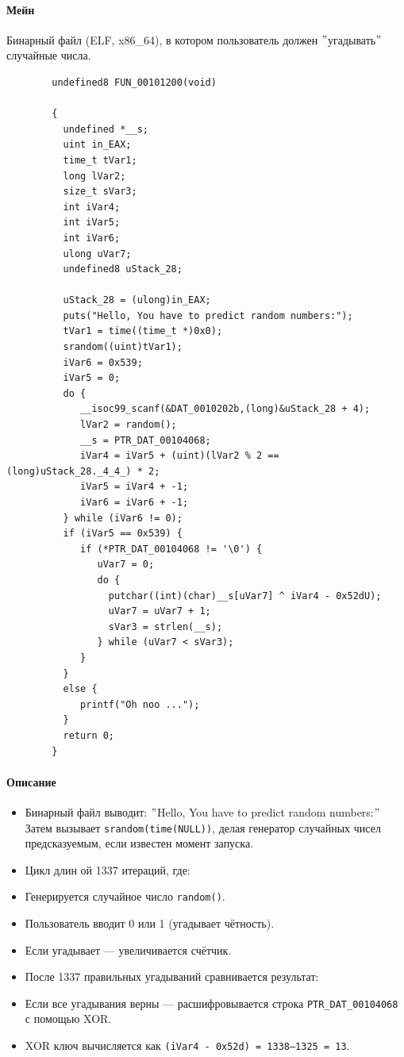 \paragraph{Мейн}
Бинарный файл (ELF, x86\_64), в котором пользователь должен \("\)угадывать\("\) случайные числа.
\begin{verbatim}
        undefined8 FUN_00101200(void)

        {
          undefined *__s;
          uint in_EAX;
          time_t tVar1;
          long lVar2;
          size_t sVar3;
          int iVar4;
          int iVar5;
          int iVar6;
          ulong uVar7;
          undefined8 uStack_28;

          uStack_28 = (ulong)in_EAX;
          puts("Hello, You have to predict random numbers:");
          tVar1 = time((time_t *)0x0);
          srandom((uint)tVar1);
          iVar6 = 0x539;
          iVar5 = 0;
          do {
             __isoc99_scanf(&DAT_0010202b,(long)&uStack_28 + 4);
             lVar2 = random();
             __s = PTR_DAT_00104068;
             iVar4 = iVar5 + (uint)(lVar2 % 2 == (long)uStack_28._4_4_) * 2;
             iVar5 = iVar4 + -1;
             iVar6 = iVar6 + -1;
          } while (iVar6 != 0);
          if (iVar5 == 0x539) {
             if (*PTR_DAT_00104068 != '\0') {
                uVar7 = 0;
                do {
                  putchar((int)(char)__s[uVar7] ^ iVar4 - 0x52dU);
                  uVar7 = uVar7 + 1;
                  sVar3 = strlen(__s);
                } while (uVar7 < sVar3);
             }
          }
          else {
             printf("Oh noo ...");
          }
          return 0;
        }
\end{verbatim}

\paragraph{Описание}
\begin{itemize}
    \item Бинарный файл выводит: \("\)Hello, You have to predict random numbers:\("\)
    Затем вызывает \texttt{srandom(time(NULL))}, делая генератор случайных чисел предсказуемым, если известен момент запуска.

    \item Цикл длин ой 1337 итераций, где:
    \item Генерируется случайное число \texttt{random()}.
    \item Пользователь вводит 0 или 1 (угадывает чётность).
    \item Если угадывает — увеличивается счётчик.
    \item После 1337 правильных угадываний сравнивается результат:
    \item Если все угадывания верны — расшифровывается строка \texttt{PTR\_DAT\_00104068} с помощью XOR.
    \item XOR ключ вычисляется как \texttt{(iVar4 - 0x52d) = 1338--1325 = 13}.
\end{itemize}

